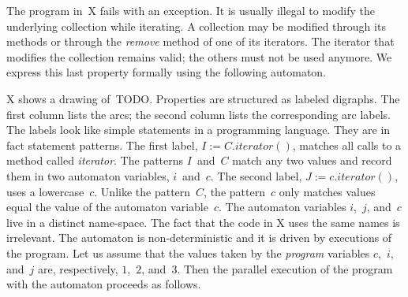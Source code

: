 \documentclass[preprint]{sigplanconf} %
\theoremstyle{definition}
\begin{document}
The program in~X fails with an exception.
It is usually illegal to modify the underlying collection while iterating.
A collection may be modified through its methods or through the \textit{remove} method of one of its iterators.
The iterator that modifies the collection remains valid; the others must not be used anymore.
We express this last property formally using the following automaton.

X shows a drawing of~TODO.
Properties are structured as labeled digraphs.
The first column lists the arcs;
the second column lists the corresponding arc labels.
The labels look like simple statements in a programming language.
They are in fact statement patterns.
The first label, $I:=C.\mathit{iterator}()$, matches all calls to a method called \textit{iterator}.
The patterns $I$~and~$C$ match any two values and record them in two automaton variables, $i$~and~$c$.
The second label, $J:=c.\mathit{iterator}()$, uses a lowercase~$c$.
Unlike the pattern~$C$, the pattern~$c$ only matches values equal the value of the automaton variable~$c$.
The automaton variables $i$,~$j$, and~$c$ live in a distinct name-space.
The fact that the code in X uses the same names is irrelevant.
The automaton is non-deterministic and it is driven by executions of the program.
Let us assume that the values taken by the \emph{program} variables $c$,~$i$, and~$j$ are, respectively, $1$,~$2$, and~$3$.
Then the parallel execution of the program with the automaton proceeds as follows.
\end{document}
